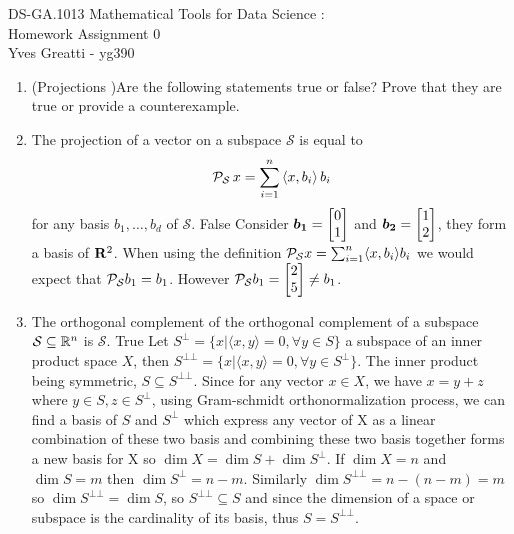\documentclass[10pt]{article}
\begin{document}
\noindent DS-GA.1013 Mathematical Tools for Data Science :\\
Homework Assignment 0 \\
Yves Greatti - yg390\\

\begin{enumerate}
\item (Projections )Are the following statements true or false? Prove that they are true or provide a counterexample. 

\be
	\item The projection of a vector on a subspace $\mathcal{S}$ is equal to 
		\begin{align*}
			\mathcal{P}_{\mathcal{S}} \, x = \sum_{i=1}^n \left \langle x, b_i\right \rangle b_i
		\end{align*}
		for any basis $b_1, \ldots, b_d$ of $\mathcal{S}$.
	False
	Consider 
	$\bm{b_1} = \begin{bmatrix} 0\\ 1\end{bmatrix}$ and $\bm{b_2} = \begin{bmatrix} 1\\ 2\end{bmatrix}$, they form a basis of ${\mathbf R}^2$.
	When using the definition $\mathcal{P}_{\mathcal{S}} x = \sum_{i=1}^n \langle x, b_i \rangle b_i$ we would expect that $\mathcal{P}_{\mathcal{S}} b_1 = b_1$. However $\mathcal{P}_{\mathcal{S}} b_1 = \begin{bmatrix} 2\\ 5\end{bmatrix} \neq b_1$.
	\item The orthogonal complement of the orthogonal complement of a subspace $\mathcal{S}\subseteq \mathbb{R}^n$ is $\mathcal{S}$.
	True
	Let $S^\bot = \{x |  \langle x,y  \rangle  = 0, \forall y \in S \}$ a subspace of an inner product space $X$, then $S^{\bot\bot} = \{x |  \langle x,y  \rangle  = 0, \forall y \in S^\bot \}$. The inner product being symmetric, $S \subseteq S^{\bot\bot}$.
	Since for any vector $x \in X$, we have $x = y + z$ where $y \in S, z \in S^\bot$, using Gram-schmidt orthonormalization process, we can find a basis of $S$ and $S^\bot$ which express any vector of X as a linear combination
	of these two basis and combining these two basis together forms a new basis for X so $\dim X = \dim S + \dim S^\bot$. If $\dim X = n$ and $\dim S = m$ then $\dim S^\bot = n - m$.
	Similarly $\dim S^{\bot\bot} = n  - (n- m) = m$ so $\dim S^{\bot\bot} = \dim S$, so $S^{\bot\bot} \subseteq S$  and since the dimension of a space or subspace is the cardinality of its basis, thus $S = S^{\bot\bot}$.

\end{enumerate}
\end{document}
